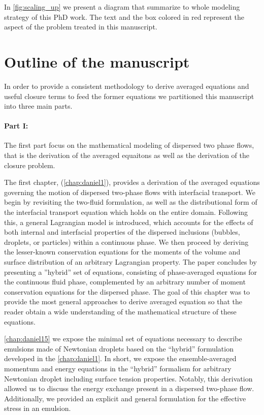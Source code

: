 In \ref{fig:scaling_up} we present a diagram that summarize to whole modeling strategy of this PhD work. 
The text and the box colored in red represent the aspect of the problem treated in this manuscript. 


\section{Outline of the manuscript}


In order to provide a consistent methodology to derive averaged equations and useful closure terms to feed the former equations we partitioned this manuscript into three main parts. 

\paragraph*{Part I: } 
The first part focus on the mathematical modeling of dispersed two phase flows, that is the derivation of the averaged equaitons as well as the derivation of the closure problem. 

The first chapter, (\ref{chap:daniel1}), provides a derivation of the averaged equations governing the motion of dispersed two-phase ﬂows with interfacial transport. 
We begin by revisiting the two-ﬂuid formulation, as well as the distributional form of the interfacial transport equation which holds on the entire domain. 
Following this, a general Lagrangian model is introduced, which accounts for the eﬀects of both internal and interfacial properties of the dispersed inclusions (bubbles, droplets, or particles) within a continuous phase.
We then proceed by deriving the lesser-known conservation equations for the moments of the volume and surface distribution of an arbitrary Lagrangian property.
The paper concludes by presenting a ”hybrid” set of equations, consisting of phase-averaged equations for the continuous ﬂuid phase, complemented by an arbitrary number of moment conservation equations for the dispersed phase.
The goal of this chapter was to provide the most general approaches to derive averaged equation so that the reader obtain a wide understanding of the mathematical structure of these equations. 

\ref{chap:daniel15} we expose the minimal set of equations necessary to describe emulsions made of Newtonian droplets based on the ``hybrid'' formulation developed in the \ref{chap:daniel1}. 
In short, we expose the ensemble-averaged momentum and energy equations in the ``hybrid'' formalism for arbitrary Newtonian droplet including surface tension properties. 
Notably, this derivation allowed us to discuss the energy exchange present in a dispersed two-phase flow. 
Additionally, we provided an explicit and general formulation for the effective stress in an emulsion. 

